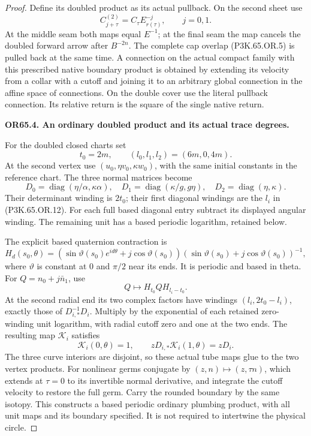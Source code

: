\begin{proof}
Define its doubled product as its actual pullback. On the second
sheet use
\[
 C^{(2)}_{j+\tau}=C_\tau E_{r(\tau)}^{-j},\qquad j=0,1.
                                                               \tag{P3K.65.OR.11}
\]
At the middle seam both maps equal \(E^{-1}\); at the final seam
the map cancels the doubled forward arrow after \(B^{-2n}\).
The complete cap overlap (P3K.65.OR.5) is pulled back at the same time.
A connection on the actual compact family with this prescribed
native boundary product is obtained by extending its velocity
from a collar with a cutoff and joining it to an arbitrary global
connection in the affine space of connections. On the double
cover use the literal pullback connection. Its relative return
is the square of the single native return.

\par\medskip\noindent\textbf{OR65.4. An ordinary doubled product and its actual trace degrees.}\par\nopagebreak[4]

For the doubled closed charts set
\[
       t_0=2m,\qquad (l_0,l_1,l_2)=(6m,0,4m).       \tag{P3K.65.OR.12}
\]
At the second vertex use \((u_0,\eta v_0,\kappa w_0)\), with
the same initial constants in the reference chart. The three
normal matrices become
\[
 D_0=\operatorname{diag}(\eta/\alpha,\kappa\alpha),\quad
 D_1=\operatorname{diag}(\kappa/g,g\eta),\quad
 D_2=\operatorname{diag}(\eta,\kappa).
\]
Their determinant winding is \(2t_0\); their first diagonal
windings are the \(l_i\) in (P3K.65.OR.12). For each full based diagonal
entry subtract its displayed angular winding. The remaining
unit has a based periodic logarithm, retained below.

The explicit based quaternion contraction is
\[
 H_d(s_0,\theta)=
 (\sin\vartheta(s_0)e^{id\theta}+j\cos\vartheta(s_0))
 (\sin\vartheta(s_0)+j\cos\vartheta(s_0))^{-1},
\]
where \(\vartheta\) is constant at 0 and \(\pi/2\) near its
ends. It is periodic and based in theta. For
\(Q=n_0+j\bar n_1\), use
\[
                    Q\mapsto H_{t_0}QH_{l_i-t_0}.   \tag{P3K.65.OR.13}
\]
At the second radial end its two complex factors have windings
\((l_i,2t_0-l_i)\), exactly those of \(D_{i,*}^{-1}D_i\).
Multiply by the exponential of each retained zero-winding unit
logarithm, with radial cutoff zero and one at the two ends.
The resulting map \(\mathcal K_i\) satisfies
\[
 \mathcal K_i(0,\theta)=1,\qquad
 zD_{i,*}\mathcal K_i(1,\theta)=zD_i.
\]
The three curve interiors are disjoint, so these actual tube maps
glue to the two vertex products. For nonlinear germs conjugate by
\((z,n)\mapsto(z,\tau n)\), which extends at \(\tau=0\)
to its invertible normal derivative, and integrate the cutoff
velocity to restore the full germ. Carry the rounded boundary by
the same isotopy. This constructs a based periodic ordinary
plumbing product, with all unit maps and its boundary specified.
It is not required to intertwine the physical circle.


\end{proof}
